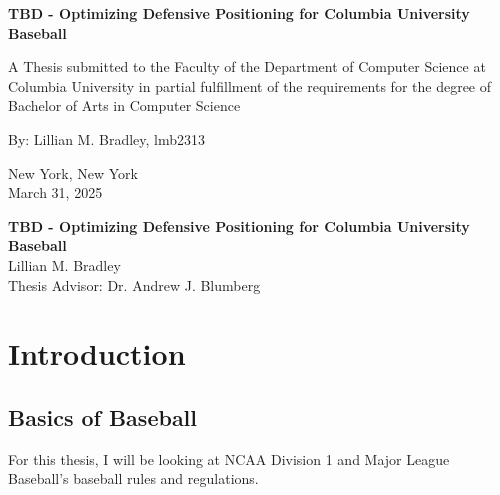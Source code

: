 \documentclass{article}
\begin{document}
\begin{titlepage}
    \centering
    {\LARGE \textbf{TBD - Optimizing Defensive Positioning for Columbia University Baseball}} \\[1.5cm] 
    
    \vspace{5cm}
    
    {\large A Thesis submitted to the Faculty of the Department of Computer Science at Columbia University in partial fulfillment of the requirements for the degree of Bachelor of Arts in Computer Science} \\[2cm]

    \vspace{5cm} 
    
    {\large By: Lillian M. Bradley, lmb2313} \\[0.5cm]
    
    
    \vfill 

    {\large New York, New York} \\[0.5cm]
    {\large March 31, 2025}
\end{titlepage}



\begin{center}
    {\textbf{TBD - Optimizing Defensive Positioning for Columbia University Baseball}} \\[1cm]
    {Lillian M. Bradley} \\[0.5cm]
    {Thesis Advisor: Dr. Andrew J. Blumberg} \\[2cm]
\end{center}
\begin{abstract} 
TO DO \end{abstract}

\newpage
\begin{Acknowledgements}
    
\end{Acknowledgements}

\newpage
\begin{Table of Contents}

\end{Table of Contents}

\section{Introduction}
\subsection{Basics of Baseball}
For this thesis, I will be looking at NCAA Division 1 and Major League Baseball's baseball rules and regulations.
\end{document}
